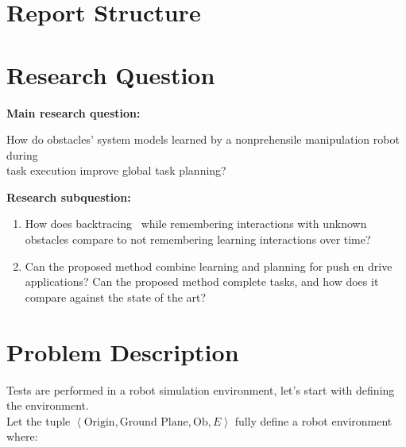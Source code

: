 \section{Report Structure}

\section{Research Question}
\textbf{Main research question:}
\begin{center}
\label{researchquestion:main}
\large
How do obstacles' system models learned by a nonprehensile manipulation robot during\\  task execution improve global task planning?
\end{center} 

\textbf{Research subquestion:}
\begin{enumerate}
    \item\label{researchsubquestion:does_it_work} How does backtracing~\cite{krontiris_dealing_2015} while remembering interactions with unknown obstacles compare to not remembering learning interactions over time?
    \item\label{researchsubquestion:does_it_compare} Can the proposed method combine learning and planning for push en drive applications? Can the proposed method complete tasks, and how does it compare against the state of the art? 
\end{enumerate}


\section{Problem Description}
\label{sec:problem_description}
Tests are performed in a robot simulation environment, let's start with defining the environment.\\Let the tuple $\left\langle \text{Origin}, \text{Ground Plane}, \text{Ob}, E \right\rangle$ fully define a robot environment where:\bs

